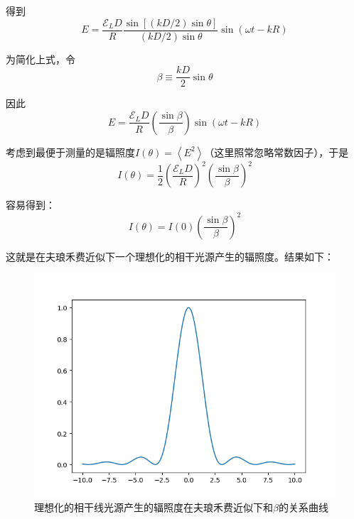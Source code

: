 \documentclass[UTF8]{ctexart}
\begin{document}
\noindent 得到
\begin{equation}
E=\frac{\mathscr{E}_{L} D}{R} \frac{\sin [(k D / 2) \sin \theta]}{(k D / 2) \sin \theta} \sin (\omega t-k R)
\end{equation}

\noindent 为简化上式，令
\begin{equation}
\beta \equiv \frac{k D}{2} \sin \theta
\end{equation}

\noindent 因此
\begin{equation}
E=\frac{\mathscr{E}_{L} D}{R}\left(\frac{\sin \beta}{\beta}\right) \sin (\omega t-k R)\label{equ_E_single_feng}
\end{equation}

\noindent 考虑到最便于测量的是辐照度$I(\theta)=\left\langle E^{2}\right\rangle$（这里照常忽略常数因子），于是
\begin{equation}
I(\theta)=\frac{1}{2}\left(\frac{\mathscr{E}_{L} D}{R}\right)^{2}\left(\frac{\sin \beta}{\beta}\right)^{2}
\end{equation}

\noindent 容易得到：
\begin{equation}
I(\theta)=I(0)\left(\frac{\sin \beta}{\beta}\right)^{2}
\end{equation}

\noindent 这就是在夫琅禾费近似下一个理想化的相干光源产生的辐照度。结果如下：
\begin{figure}[ht]
	\centering
	\includegraphics[width=12cm]{Diffraction_fulang_I.png}
	\caption{理想化的相干线光源产生的辐照度在夫琅禾费近似下和$ \beta $的关系曲线}
	\label{figure_fulang_I}
\end{figure}
\end{document}
